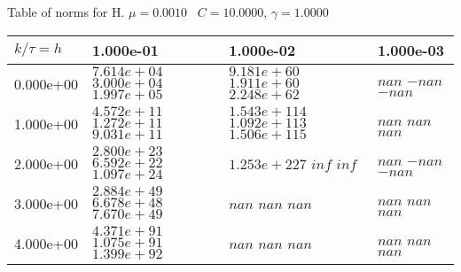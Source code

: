 \begin{center}
Table of norms for H. $\mu = 0.0010$ \, $C = 10.0000$, $\gamma = 1.0000$
  
\begin{tabular}{|p{1in}|p{1in}|p{1in}|p{1in}|} \hline
$k / \tau = h$ &1.000e-01 &1.000e-02 &1.000e-03 \\ \hline 
0.000e+00 & $7.614e+04$  $3.000e+04$  $1.997e+05$  & $9.181e+60$  $1.911e+60$  $2.248e+62$  & $nan$  $-nan$  $-nan$  \\ \hline 
1.000e+00 & $4.572e+11$  $1.272e+11$  $9.031e+11$  & $1.543e+114$  $1.092e+113$  $1.506e+115$  & $nan$  $nan$  $nan$  \\ \hline 
2.000e+00 & $2.800e+23$  $6.592e+22$  $1.097e+24$  & $1.253e+227$  $inf$  $inf$  & $nan$  $-nan$  $-nan$  \\ \hline 
3.000e+00 & $2.884e+49$  $6.678e+48$  $7.670e+49$  & $nan$  $nan$  $nan$  & $nan$  $nan$  $nan$  \\ \hline 
4.000e+00 & $4.371e+91$  $1.075e+91$  $1.399e+92$  & $nan$  $nan$  $nan$  & $nan$  $nan$  $nan$  \\ \hline 

\end{tabular}\\[20pt]
\end{center}
